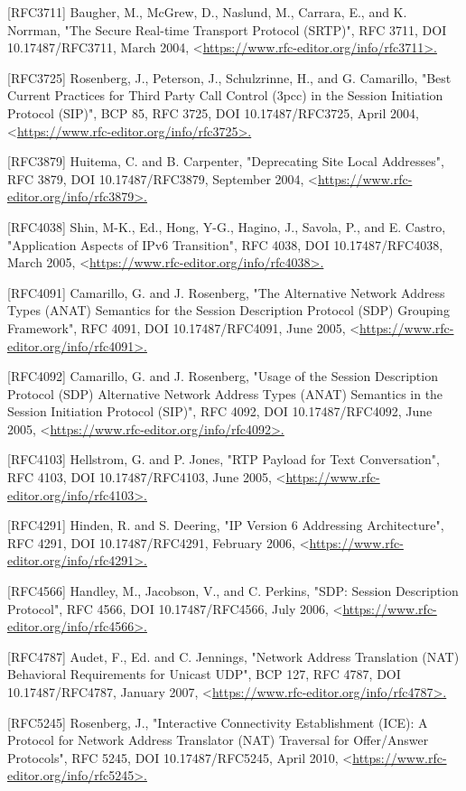 \documentclass{article}
\begin{document}
[RFC3711]  Baugher, M., McGrew, D., Naslund, M., Carrara, E., and K. Norrman, "The Secure Real-time Transport Protocol (SRTP)", RFC 3711, DOI 10.17487/RFC3711, March 2004, <\url{https://www.rfc-editor.org/info/rfc3711>.}

[RFC3725]  Rosenberg, J., Peterson, J., Schulzrinne, H., and G. Camarillo, "Best Current Practices for Third Party Call Control (3pcc) in the Session Initiation Protocol (SIP)", BCP 85, RFC 3725, DOI 10.17487/RFC3725, April 2004, <\url{https://www.rfc-editor.org/info/rfc3725>.}

[RFC3879]  Huitema, C. and B. Carpenter, "Deprecating Site Local Addresses", RFC 3879, DOI 10.17487/RFC3879, September 2004, <\url{https://www.rfc-editor.org/info/rfc3879>.}

[RFC4038]  Shin, M-K., Ed., Hong, Y-G., Hagino, J., Savola, P., and E. Castro, "Application Aspects of IPv6 Transition", RFC 4038, DOI 10.17487/RFC4038, March 2005, <\url{https://www.rfc-editor.org/info/rfc4038>.}

[RFC4091]  Camarillo, G. and J. Rosenberg, "The Alternative Network Address Types (ANAT) Semantics for the Session Description Protocol (SDP) Grouping Framework", RFC 4091, DOI 10.17487/RFC4091, June 2005, <\url{https://www.rfc-editor.org/info/rfc4091>.}

[RFC4092]  Camarillo, G. and J. Rosenberg, "Usage of the Session Description Protocol (SDP) Alternative Network Address Types (ANAT) Semantics in the Session Initiation Protocol (SIP)", RFC 4092, DOI 10.17487/RFC4092, June 2005, <\url{https://www.rfc-editor.org/info/rfc4092>.}

[RFC4103]  Hellstrom, G. and P. Jones, "RTP Payload for Text Conversation", RFC 4103, DOI 10.17487/RFC4103, June 2005, <\url{https://www.rfc-editor.org/info/rfc4103>.}

[RFC4291]  Hinden, R. and S. Deering, "IP Version 6 Addressing Architecture", RFC 4291, DOI 10.17487/RFC4291, February 2006, <\url{https://www.rfc-editor.org/info/rfc4291>.}

[RFC4566]  Handley, M., Jacobson, V., and C. Perkins, "SDP: Session Description Protocol", RFC 4566, DOI 10.17487/RFC4566, July 2006, <\url{https://www.rfc-editor.org/info/rfc4566>.}

[RFC4787]  Audet, F., Ed. and C. Jennings, "Network Address Translation (NAT) Behavioral Requirements for Unicast UDP", BCP 127, RFC 4787, DOI 10.17487/RFC4787, January 2007, <\url{https://www.rfc-editor.org/info/rfc4787>.}

[RFC5245]  Rosenberg, J., "Interactive Connectivity Establishment (ICE): A Protocol for Network Address Translator (NAT) Traversal for Offer/Answer Protocols", RFC 5245, DOI 10.17487/RFC5245, April 2010, <\url{https://www.rfc-editor.org/info/rfc5245>.}
\end{document}
